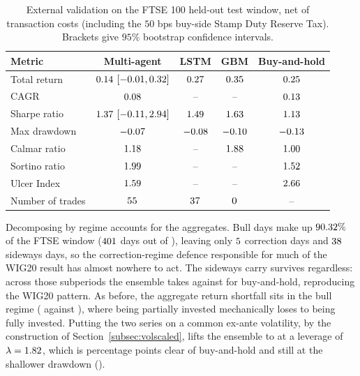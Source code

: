 \begin{table}[!htbp]
\centering
\small
\setlength{\tabcolsep}{4pt}
\caption{External validation on the FTSE 100 held-out test window, net of transaction costs (including the $50$ bps buy-side Stamp Duty Reserve Tax). Brackets give $95\%$ bootstrap confidence intervals.}
\label{tab:ftse}
\begin{tabular}{lcccc}
\toprule
\textbf{Metric} & \textbf{Multi-agent} & \textbf{LSTM} & \textbf{GBM} & \textbf{Buy-and-hold} \\
\midrule
Total return     & $0.14$ $[-0.01, 0.32]$ & $0.27$   & $0.35$ & $0.25$ \\
CAGR             & $0.08$    & --              & -- & $0.13$ \\
Sharpe ratio     & $1.37$ $[-0.11, 2.94]$ & $1.49$ & $1.63$ & $1.13$ \\
Max drawdown     & $-0.07$     & $-0.08$  & $-0.10$ & $-0.13$ \\
Calmar ratio     & $1.18$  & --              & $1.88$ & $1.00$ \\
Sortino ratio    & $1.99$ & --           & -- & $1.52$ \\
Ulcer Index      & $1.59$   & --           & -- & $2.66$ \\
Number of trades & $55$ & $37$ & $0$ & -- \\
\bottomrule
\end{tabular}
\end{table}

Decomposing by regime accounts for the aggregates. Bull days make up $90.32\%{}$ of the FTSE window ($401{}$ days out of \FtseOOSDays{}), leaving only $5{}$ correction days and $38{}$ sideways days, so the correction-regime defence responsible for much of the WIG20 result has almost nowhere to act. The sideways carry survives regardless: across those subperiods the ensemble takes \FtseEnsSidewaysTR{} against \FtseBHSidewaysTR{} for buy-and-hold, reproducing the WIG20 pattern. As before, the aggregate return shortfall sits in the bull regime (\FtseEnsBullTR{} against \FtseBHBullTR{}), where being partially invested mechanically loses to being fully invested. Putting the two series on a common ex-ante volatility, by the construction of Section~\ref{subsec:volscaled}, lifts the ensemble to \FtseVolScaledTR{} at a leverage of $\lambda = 1.82{}$, which is \FtseVolScaledExcessPP{} percentage points clear of buy-and-hold and still at the shallower drawdown (\FtseVolScaledMDD{}).

